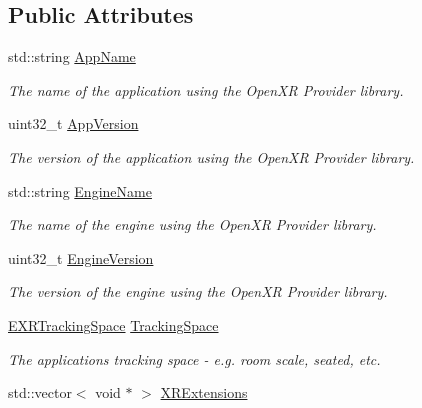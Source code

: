 \subsection*{Public Attributes}
\begin{DoxyCompactItemize}
\item 
std\+::string \mbox{\hyperlink{struct_open_x_r_provider_1_1_x_r_app_info_a3f925ed1613048c762d3d4dc66d5ac30}{App\+Name}}
\begin{DoxyCompactList}\small\item\em The name of the application using the Open\+XR Provider library. \end{DoxyCompactList}\item 
uint32\+\_\+t \mbox{\hyperlink{struct_open_x_r_provider_1_1_x_r_app_info_af56a88a507d77b363c6984560511578c}{App\+Version}}
\begin{DoxyCompactList}\small\item\em The version of the application using the Open\+XR Provider library. \end{DoxyCompactList}\item 
std\+::string \mbox{\hyperlink{struct_open_x_r_provider_1_1_x_r_app_info_af7200994789e0e1edd4acb80bd8742f1}{Engine\+Name}}
\begin{DoxyCompactList}\small\item\em The name of the engine using the Open\+XR Provider library. \end{DoxyCompactList}\item 
uint32\+\_\+t \mbox{\hyperlink{struct_open_x_r_provider_1_1_x_r_app_info_a941d70698375c4ccdbffdaa0cef92122}{Engine\+Version}}
\begin{DoxyCompactList}\small\item\em The version of the engine using the Open\+XR Provider library. \end{DoxyCompactList}\item 
\mbox{\hyperlink{namespace_open_x_r_provider_a005dd91723b05b123b8fccbc41798b05}{E\+X\+R\+Tracking\+Space}} \mbox{\hyperlink{struct_open_x_r_provider_1_1_x_r_app_info_adc373e7d26617bc10d2d46d6152a6a17}{Tracking\+Space}}
\begin{DoxyCompactList}\small\item\em The application\textquotesingle{}s tracking space -\/ e.\+g. room scale, seated, etc. \end{DoxyCompactList}\item 
std\+::vector$<$ void $\ast$ $>$ \mbox{\hyperlink{struct_open_x_r_provider_1_1_x_r_app_info_a8b51fa00d11c4b3711440bf4b20b57fe}{X\+R\+Extensions}}

\end{DoxyCompactItemize}
